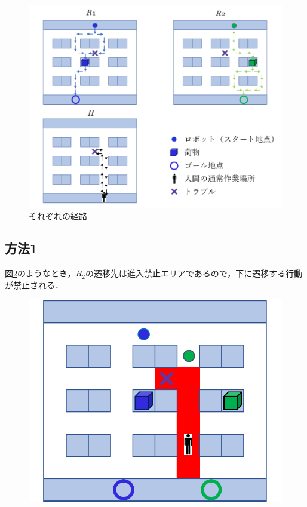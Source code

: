 \begin{figure}[h]
    \centering
    \includegraphics[scale=0.38]{figures/case.pdf}
    \caption{それぞれの経路}
    \label{fig:case}
\end{figure}

\subsection{方法1}

図\ref{fig:case_Method1}のようなとき，$R_2$の遷移先は進入禁止エリアであるので，下に遷移する行動が禁止される．

\begin{figure}
  \includegraphics[scale=0.2]{figures/case_Method1.pdf}
  \caption{}
  \label{fig:case_Method1}
\end{figure}

